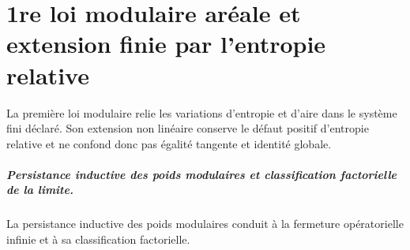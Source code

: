 \chapter{1re loi modulaire aréale et extension finie par l’entropie relative}
\label{chap:parte-iv-61}

La première loi modulaire relie les variations d’entropie et d’aire dans le système fini déclaré. Son extension non linéaire conserve le défaut positif d’entropie relative et ne confond donc pas égalité tangente et identité globale.



\paragraph{Persistance inductive des poids modulaires et classification factorielle de la limite.} La persistance inductive des poids modulaires conduit à la fermeture opératorielle infinie et à sa classification factorielle.
